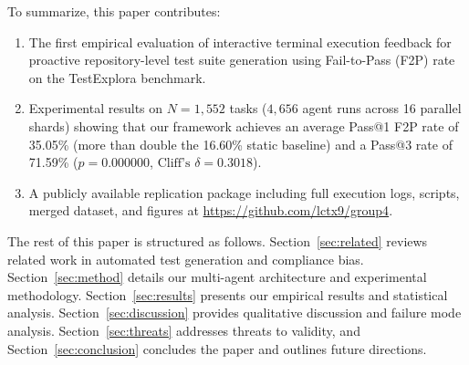 To summarize, this paper contributes:
\begin{enumerate}
    \item The first empirical evaluation of interactive terminal execution feedback for proactive repository-level test suite generation using Fail-to-Pass (F2P) rate on the TestExplora benchmark.
    \item Experimental results on $N=1,552$ tasks ($4,656$ agent runs across 16 parallel shards) showing that our framework achieves an average Pass@1 F2P rate of 35.05\% (more than double the 16.60\% static baseline) and a Pass@3 rate of 71.59\% ($p = 0.000000$, $\text{Cliff's } \delta = 0.3018$).
    \item A publicly available replication package including full execution logs, scripts, merged dataset, and figures at \url{https://github.com/lctx9/group4}.
\end{enumerate}

The rest of this paper is structured as follows. Section~\ref{sec:related} reviews related work in automated test generation and compliance bias. Section~\ref{sec:method} details our multi-agent architecture and experimental methodology. Section~\ref{sec:results} presents our empirical results and statistical analysis. Section~\ref{sec:discussion} provides qualitative discussion and failure mode analysis. Section~\ref{sec:threats} addresses threats to validity, and Section~\ref{sec:conclusion} concludes the paper and outlines future directions.
